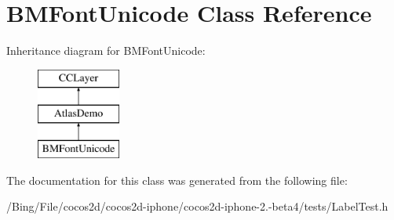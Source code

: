 \hypertarget{interface_b_m_font_unicode}{\section{B\-M\-Font\-Unicode Class Reference}
\label{interface_b_m_font_unicode}
}
Inheritance diagram for B\-M\-Font\-Unicode\-:\begin{figure}[H]
\begin{center}
\leavevmode
\includegraphics[height=3.000000cm]{interface_b_m_font_unicode}
\end{center}
\end{figure}


The documentation for this class was generated from the following file\-:\begin{DoxyCompactItemize}
\item 
/\-Bing/\-File/cocos2d/cocos2d-\/iphone/cocos2d-\/iphone-\/2.-\/beta4/tests/Label\-Test.\-h\end{DoxyCompactItemize}
